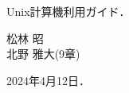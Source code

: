\documentclass[main]{subfiles}
\begin{document}
\begin{titlepage}
    \vspace*{0.25\textheight} %

    \fontsize{25pt}{25pt} \selectfont

    \centering
    Unix計算機利用ガイド．
    \vspace{25pt}
    \fontsize{14pt}{14pt} \selectfont

    \centering
    松林 昭 \\
    \vspace{7pt}
    北野 雅大(9章)\\
    \vspace{14pt}

    2024年4月12日．\\
    \normalsize

\end{titlepage}
\end{document}
